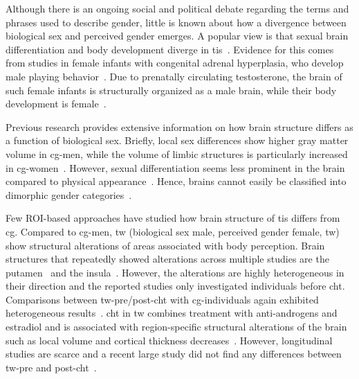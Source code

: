 \documentclass{article}
\begin{document}
    Although there is an ongoing social and political debate regarding the terms and phrases used to describe gender, little is known about how a divergence between biological sex and perceived gender emerges. A popular view is that sexual brain differentiation and body development diverge in \acp{ti}~\cite{Zhou1995}. Evidence for this comes from studies in female infants with congenital adrenal hyperplasia, who develop male playing behavior~\cite{Meyer-Bahlburg1996, Mathews2009}. Due to prenatally circulating testosterone, the brain of such female infants is structurally organized as a male brain, while their body development is female~\cite{Zhou1995, Meyer-Bahlburg1996, Mathews2009, Bao2011, VanGoozen1995}.

    Previous research provides extensive information on how brain structure differs as a function of biological sex. Briefly, local sex differences show higher gray matter volume in \ac{cg}-men, while the volume of limbic structures is particularly increased in \ac{cg}-women~\cite{Ruigrok2014}. However, sexual differentiation seems less prominent in the brain compared to physical appearance~\cite{Cahill2006, McCarthy2011, Spizzirri2018}. Hence, brains cannot easily be classified into dimorphic gender categories~\cite{Joel2015}.

    Few ROI-based approaches have studied how brain structure of \acp{ti} differs from \ac{cg}. Compared to \ac{cg}-men, \acl{tw} (biological sex male, perceived gender female, \ac{tw}) show structural alterations of areas associated with body perception. Brain structures that repeatedly showed alterations across multiple studies are the putamen~\cite{Luders2009} and the insula~\cite{Savic2011}. However, the alterations are highly heterogeneous in their direction and the reported studies only investigated individuals before \ac{cht}. Comparisons between \ac{tw}-pre/post-\ac{cht} with \ac{cg}-individuals again exhibited heterogeneous results~\cite{Spizzirri2018, Mueller2017, Altinay2019, Seiger2016, Nguyen2018, Nguyen2018a, WhiteHughto2016}. \ac{cht} in \ac{tw} combines treatment with anti-androgens and estradiol and is associated with region-specific structural alterations of the brain~\cite{Kranz2017} such as local volume and cortical thickness decreases~\cite{Seiger2016, Mueller2017a}. However, longitudinal studies are scarce and a recent large study did not find any differences between \ac{tw}-pre and post-\ac{cht}~\cite{Spizzirri2018, Nguyen2018}.
\end{document}
